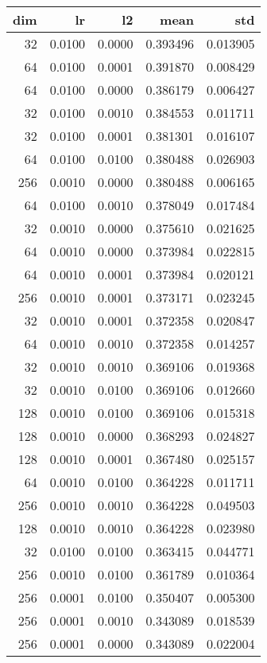 \begin{tabular}{rrrrr}
\toprule
 dim &      lr &      l2 &      mean &       std \\
\midrule
  32 &  0.0100 &  0.0000 &  0.393496 &  0.013905 \\
  64 &  0.0100 &  0.0001 &  0.391870 &  0.008429 \\
  64 &  0.0100 &  0.0000 &  0.386179 &  0.006427 \\
  32 &  0.0100 &  0.0010 &  0.384553 &  0.011711 \\
  32 &  0.0100 &  0.0001 &  0.381301 &  0.016107 \\
  64 &  0.0100 &  0.0100 &  0.380488 &  0.026903 \\
 256 &  0.0010 &  0.0000 &  0.380488 &  0.006165 \\
  64 &  0.0100 &  0.0010 &  0.378049 &  0.017484 \\
  32 &  0.0010 &  0.0000 &  0.375610 &  0.021625 \\
  64 &  0.0010 &  0.0000 &  0.373984 &  0.022815 \\
  64 &  0.0010 &  0.0001 &  0.373984 &  0.020121 \\
 256 &  0.0010 &  0.0001 &  0.373171 &  0.023245 \\
  32 &  0.0010 &  0.0001 &  0.372358 &  0.020847 \\
  64 &  0.0010 &  0.0010 &  0.372358 &  0.014257 \\
  32 &  0.0010 &  0.0010 &  0.369106 &  0.019368 \\
  32 &  0.0010 &  0.0100 &  0.369106 &  0.012660 \\
 128 &  0.0010 &  0.0100 &  0.369106 &  0.015318 \\
 128 &  0.0010 &  0.0000 &  0.368293 &  0.024827 \\
 128 &  0.0010 &  0.0001 &  0.367480 &  0.025157 \\
  64 &  0.0010 &  0.0100 &  0.364228 &  0.011711 \\
 256 &  0.0010 &  0.0010 &  0.364228 &  0.049503 \\
 128 &  0.0010 &  0.0010 &  0.364228 &  0.023980 \\
  32 &  0.0100 &  0.0100 &  0.363415 &  0.044771 \\
 256 &  0.0010 &  0.0100 &  0.361789 &  0.010364 \\
 256 &  0.0001 &  0.0100 &  0.350407 &  0.005300 \\
 256 &  0.0001 &  0.0010 &  0.343089 &  0.018539 \\
 256 &  0.0001 &  0.0000 &  0.343089 &  0.022004 \\

\end{tabular}
